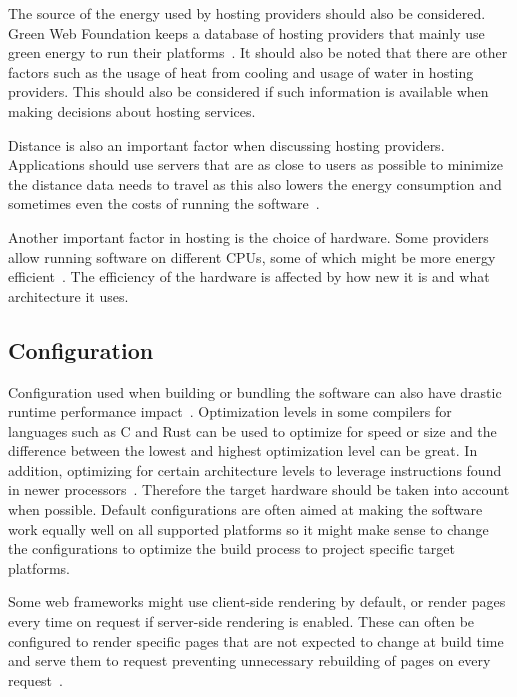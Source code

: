 The source of the energy used by hosting providers should also be considered. Green Web Foundation keeps a database of hosting providers that mainly use green energy to run their platforms~\cite{greenwebGreenFoundation}. It should also be noted that there are other factors such as the usage of heat from cooling and usage of water in hosting providers. This should also be considered if such information is available when making decisions about hosting services. 

Distance is also an important factor when discussing hosting providers. Applications should use servers that are as close to users as possible to minimize the distance data needs to travel as this also lowers the energy consumption and sometimes even the costs of running the software~\cite{greensoftwareGreenSoftware}.

Another important factor in hosting is the choice of hardware. Some providers allow running software on different CPUs, some of which might be more energy efficient~\cite{greensoftwareGreenSoftware}. The efficiency of the hardware is affected by how new it is and what architecture it uses.

\subsection{Configuration}\label{configuration}
Configuration used when building or bundling the software can also have drastic runtime performance impact~\cite{twinsorfalseffriends}. Optimization levels in some compilers for languages such as C and Rust can be used to optimize for speed or size and the difference between the lowest and highest optimization level can be great. In addition, optimizing for certain architecture levels to leverage instructions found in newer processors~\cite{phoronixBenchmarkingExperimental}. Therefore the target hardware should be taken into account when possible. Default configurations are often aimed at making the software work equally well on all supported platforms so it might make sense to change the configurations to optimize the build process to project specific target platforms.

Some web frameworks might use client-side rendering by default, or render pages every time on request if server-side rendering is enabled. These can often be configured to render specific pages that are not expected to change at build time and serve them to request preventing unnecessary rebuilding of pages on every request~\cite{greensoftwareGreenSoftware}.

